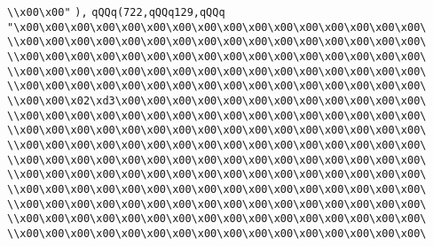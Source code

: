 \verb|\\x00\x00"|\newline
\verb|),|\newline
\verb|qQQq(722,qQQq129,qQQq|\newline
\verb|"\x00\x00\x00\x00\x00\x00\x00\x00\x00\x00\x00\x00\x00\x00\x00\x00\|\newline
\verb|\\x00\x00\x00\x00\x00\x00\x00\x00\x00\x00\x00\x00\x00\x00\x00\x00\|\newline
\verb|\\x00\x00\x00\x00\x00\x00\x00\x00\x00\x00\x00\x00\x00\x00\x00\x00\|\newline
\verb|\\x00\x00\x00\x00\x00\x00\x00\x00\x00\x00\x00\x00\x00\x00\x00\x00\|\newline
\verb|\\x00\x00\x00\x00\x00\x00\x00\x00\x00\x00\x00\x00\x00\x00\x00\x00\|\newline
\verb|\\x00\x00\x02\xd3\x00\x00\x00\x00\x00\x00\x00\x00\x00\x00\x00\x00\|\newline
\verb|\\x00\x00\x00\x00\x00\x00\x00\x00\x00\x00\x00\x00\x00\x00\x00\x00\|\newline
\verb|\\x00\x00\x00\x00\x00\x00\x00\x00\x00\x00\x00\x00\x00\x00\x00\x00\|\newline
\verb|\\x00\x00\x00\x00\x00\x00\x00\x00\x00\x00\x00\x00\x00\x00\x00\x00\|\newline
\verb|\\x00\x00\x00\x00\x00\x00\x00\x00\x00\x00\x00\x00\x00\x00\x00\x00\|\newline
\verb|\\x00\x00\x00\x00\x00\x00\x00\x00\x00\x00\x00\x00\x00\x00\x00\x00\|\newline
\verb|\\x00\x00\x00\x00\x00\x00\x00\x00\x00\x00\x00\x00\x00\x00\x00\x00\|\newline
\verb|\\x00\x00\x00\x00\x00\x00\x00\x00\x00\x00\x00\x00\x00\x00\x00\x00\|\newline
\verb|\\x00\x00\x00\x00\x00\x00\x00\x00\x00\x00\x00\x00\x00\x00\x00\x00\|\newline
\verb|\\x00\x00\x00\x00\x00\x00\x00\x00\x00\x00\x00\x00\x00\x00\x00\x00\|\newline
